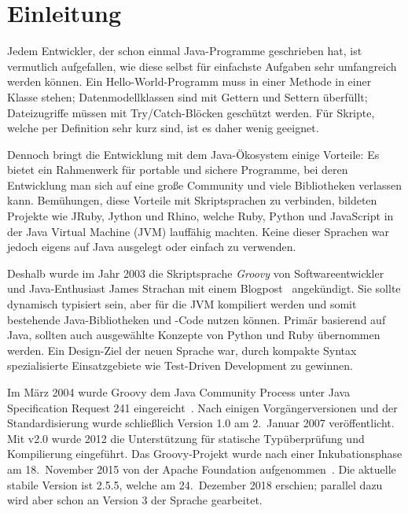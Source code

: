 \documentclass[a4paper]{article}
\title{\paperTitle}
\author{\paperAuthor}
\date{\paperDate}
\begin{document}

\maketitle


\section{Einleitung}\label{sec:einleitung}

Jedem Entwickler, der schon einmal Java-Programme geschrieben hat, ist vermutlich aufgefallen, wie diese selbst für einfachste Aufgaben sehr umfangreich werden können.
Ein Hello-World-Programm muss in einer Methode in einer Klasse stehen;
Datenmodellklassen sind mit Gettern und Settern überfüllt;
Dateizugriffe müssen mit Try/Catch-Blöcken geschützt werden.
Für Skripte, welche per Definition sehr kurz sind, ist es daher wenig geeignet.

Dennoch bringt die Entwicklung mit dem Java-Ökosystem einige Vorteile:
Es bietet ein Rahmenwerk für portable und sichere Programme, bei deren Entwicklung man sich auf eine große Community und viele Bibliotheken verlassen kann.
Bemühungen, diese Vorteile mit Skriptsprachen zu verbinden, bildeten Projekte wie JRuby, Jython und Rhino, welche Ruby, Python und JavaScript in der Java Virtual Machine (JVM) lauffähig machten.
Keine dieser Sprachen war jedoch eigens auf Java ausgelegt oder einfach zu verwenden.

Deshalb wurde im Jahr 2003 die Skriptsprache \emph{Groovy} von Softwareentwickler und Java-Enthusiast James Strachan mit einem Blogpost~\cite{james-strachan-blog} angekündigt.
Sie sollte dynamisch typisiert sein, aber für die JVM kompiliert werden und somit bestehende Java-Bibliotheken und -Code nutzen können.
Primär basierend auf Java, sollten auch ausgewählte Konzepte von Python und Ruby übernommen werden.
Ein Design-Ziel der neuen Sprache war, durch kompakte Syntax spezialisierte Einsatzgebiete wie Test-Driven Development zu gewinnen.

Im März 2004 wurde Groovy dem Java Community Process unter Java Specification Request 241 eingereicht~\cite{jcp:jsr241}.
Nach einigen Vorgängerversionen und der Standardisierung wurde schließlich Version 1.0 am 2.~Januar 2007 veröffentlicht.
Mit v2.0 wurde 2012 die Unterstützung für statische Typüberprüfung und Kompilierung eingeführt.
Das Groovy-Projekt wurde nach einer Inkubationsphase am 18.~November 2015 von der Apache Foundation aufgenommen~\cite{apache-incubator:groovy}.
Die aktuelle stabile Version ist 2.5.5, welche am 24.~Dezember 2018 erschien; parallel dazu wird aber schon an Version 3 der Sprache gearbeitet.
\end{document}
